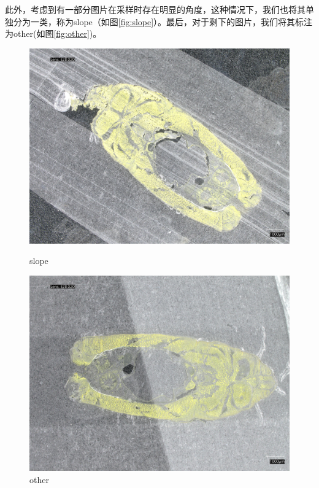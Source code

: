此外，考虑到有一部分图片在采样时存在明显的角度，这种情况下，我们也将其单独分为一类，称为slope（如图\autoref{fig:slope}）。最后，对于剩下的图片，我们将其标注为other(如图\autoref{fig:other})。

\begin{figure}[H]
    \centering
    \begin{minipage}{0.45\textwidth}
        \centering
        \includegraphics[width=\textwidth]{./fig/sample_1/slope.jpg}
        \caption{slope}
        \label{fig:slope}
    \end{minipage}
    \begin{minipage}{0.45\textwidth}
        \centering
        \includegraphics[width=\textwidth]{./fig/sample_1/other.jpg}
        \caption{other}
        \label{fig:other}
    \end{minipage}
\end{figure}

